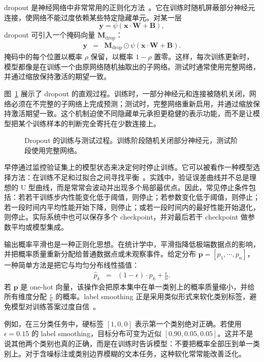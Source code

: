 dropout 是神经网络中非常常用的正则化方法~\cite{hinton-etal:2012improving,SrivastavaEtAl2014Dropout}。它在训练时随机屏蔽部分神经元连接，使网络不能过度依赖某些特定隐藏单元。对某一层
\[
\mathbf{y}=\psi(\mathbf{x}\cdot\mathbf{W}+\mathbf{B}),
\]
dropout 可引入一个掩码向量 $\mathbf{M}_{\mathrm{drop}}$：
\begin{eqnarray}
\mathbf{y}
& = &
\mathbf{M}_{\mathrm{drop}}
\odot
\psi(\mathbf{x}\cdot\mathbf{W}+\mathbf{B}).
\end{eqnarray}
掩码中的每个位置以概率 $\rho$ 保留，以概率 $1-\rho$ 置零。这样，每次训练更新时，模型都像是在训练一个由原网络随机抽取出的子网络。测试时通常使用完整网络，并通过缩放保持激活的期望一致。

图~\ref{fig:aml-dropout-network} 展示了 dropout 的直观过程。训练时，一部分神经元和连接被随机关闭，网络必须在不完整的子网络上完成预测；测试时，完整网络重新启用，并通过缩放保持激活期望一致。这个机制迫使不同隐藏单元承担更稳健的表示功能，而不是让模型把某个训练样本的判断完全寄托在少数连接上。

\begin{figure}[htbp]
  \centering
  
  \caption{Dropout 的训练与测试过程。训练阶段随机关闭部分神经元，测试阶段使用完整网络。}
  \label{fig:aml-dropout-network}
\end{figure}

早停通过监控验证集上的模型状态来决定何时停止训练。它可以被看作一种模型选择方法：在训练不足和过拟合之间寻找平衡~\cite{GoodfellowEtAl2016DeepLearning,prechelt1998early}。实践中，验证误差曲线并不总是理想的 U 型曲线，而是常常会波动并出现多个局部最优点。因此，常见停止条件包括：若若干训练步内性能变化低于阈值，则停止；若参数变化低于阈值，则停止；若一段时间内平均性能开始下降，则停止；或若一段时间内的最好性能开始退化，则停止。实际系统中也可以保存多个 checkpoint，并对最后若干 checkpoint 做参数平均或模型集成。

输出概率平滑也是一种正则化思想。在统计学中，平滑指降低极端数据点的影响，并把概率质量重新分配给普通数据点或未观察事件。给定分布 $\mathbf{p}=[p_1,\cdots,p_n]$，一种简单方法是把它与均匀分布线性插值：
\begin{eqnarray}
\hat{p}_k
& = &
(1-\epsilon)\cdot p_k+\frac{\epsilon}{n}.
\end{eqnarray}
若 $\mathbf{p}$ 是 one-hot 向量，该操作会把原本集中在单一类别上的概率质量缩小，并给所有维度分配 $\frac{\epsilon}{n}$ 的概率。label smoothing 正是采用类似形式来软化类别标签，避免模型对训练答案过度自信~\cite{SzegedyEtAl2016LabelSmoothing}。

例如，在三分类任务中，硬标签 $[1,0,0]$ 表示第一个类别绝对正确。若使用 $\epsilon=0.15$ 的 label smoothing，目标分布可变为近似 $[0.90,0.05,0.05]$。这并不是说其他两个类别也真的正确，而是在训练时告诉模型：不要把概率全部压到单一类别上。对于含噪标注或类别边界模糊的文本任务，这种软化常常能改善泛化。

